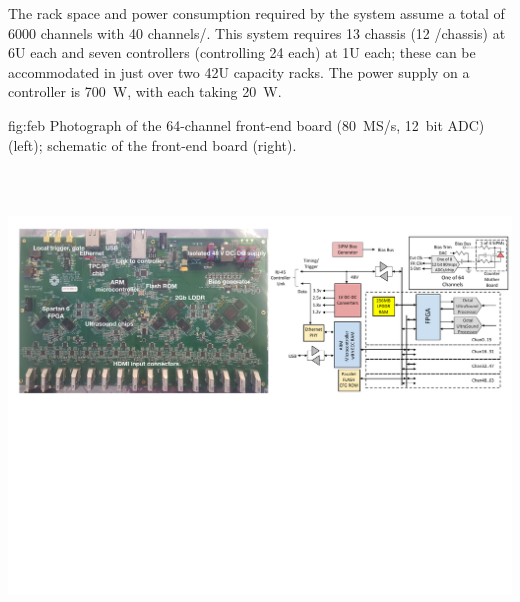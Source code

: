 The rack space and power consumption required by the system assume
a total of 6000 channels with 40 channels/. This system requires 13 chassis (12 /chassis) at 6U each and seven controllers (controlling 24  each) at 1U each; these can be accommodated in just over two 42U capacity racks. The power supply on a controller is \SI{700}{W}, with each  taking \SI{20}{W}. 
 

\begin{dunefigure}
 {fig:feb}
 {Photograph of the 64-channel  front-end board (\SI{80}{MS/s}, \SI{12}{bit} ADC) (left); schematic of the front-end board (right).}
\includegraphics[height=5.2in]{graphics/pds-feb-tdr.pdf} 
\vspace{-6.3cm}
\end{dunefigure}

